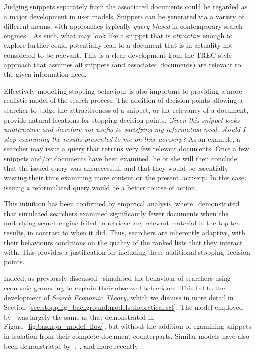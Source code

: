 Judging snippets separately from the associated documents could be regarded as a major development in user models. Snippets can be generated via a variety of different means, with approaches typically \emph{query biased} in contemporary search engines~\citep{tombros1998query_biased}. As such, what may look like a snippet that is \emph{attractive} enough to explore further could potentially lead to a document that is in actuality not considered to be relevant. This is a clear development from the TREC-style approach that assumes all snippets (and associated documents) are relevant to the given information need.

Effectively modelling stopping behaviour is also important to providing a more realistic model of the search process. The addition of decision points allowing a searcher to judge the attractiveness of a snippet, or the relevancy of a document, provide natural locations for stopping decision points. \emph{Given this snippet looks unattractive and therefore not useful to satisfying my information need, should I stop examining the results presented to me on this~\gls{acr:serp}?} As an example, a searcher may issue a query that returns very few relevant documents. Once a few snippets and/or documents have been examined, he or she will then conclude that the issued query was unsuccessful, and that they would be essentially wasting their time examining more content on the present~\gls{acr:serp}. In this case, issuing a reformulated query would be a better course of action.

This intuition has been confirmed by empirical analysis, where~\cite{azzopardi2011economics} demonstrated that simulated searchers examined significantly fewer documents when the underlying search engine failed to retrieve any relevant material in the top ten results, in contrast to when it did. Thus, searchers are inherently adaptive, with their behaviours conditions on the quality of the ranked lists that they interact with. This provides a justification for including these additional stopping decision points.

Indeed, as previously discussed~\cite{azzopardi2011economics} simulated the behaviour of searchers using economic grounding to explain their observed behaviours. This led to the development of \emph{Search Economic Theory,} which we discuss in more detail in Section~\ref{sec:stopping_background:models:theoretical:set}. The model employed by~\cite{azzopardi2011economics} was largely the same as that demonstrated in Figure~\ref{fig:baskaya_model_flow}, but without the addition of examining snippets in isolation from their complete document counterparts. Similar models have also been demonstrated by~\cite{yilmaz2010browsing_utility},~\cite{carterette2011models}, and more recently~\cite{zhang2017simulation_model}.

